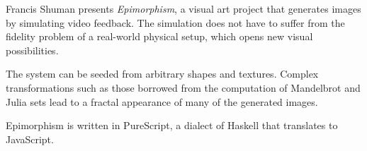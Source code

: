 \documentclass{sigplanconf}
\begin{document}
Francis Shuman presents \textit{Epimorphism}, a visual art project that
generates images by simulating video feedback.  The simulation does
not have to suffer from the fidelity problem of a real-world physical
setup, which opens new visual possibilities.

The system can be seeded from arbitrary shapes and textures.  Complex
transformations such as those borrowed from the computation of
Mandelbrot and Julia sets lead to a fractal appearance of many of the
generated images.

Epimorphism is written in PureScript, a dialect of Haskell that
translates to JavaScript.
\end{document}

